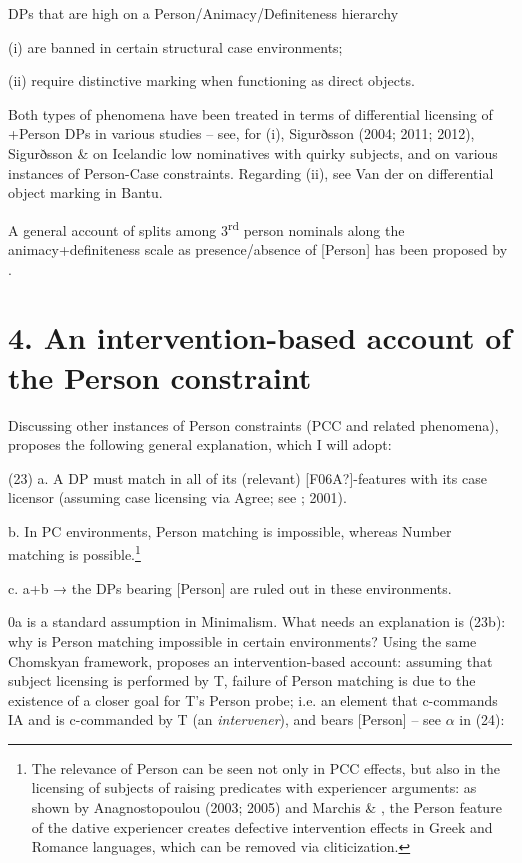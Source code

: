 \documentclass[output=paper]{langsci/langscibook}
\begin{document}
          DPs that are high on a Person/Animacy/Definiteness hierarchy

(i) are banned in certain structural case environments;

(ii) require distinctive marking when functioning as direct objects.

Both types of phenomena have been treated in terms of differential licensing of +Person DPs in various studies – see, for (i), Sigurðsson (2004; 2011; 2012), Sigurðsson \& \citet{Holmberg2008} on Icelandic low nominatives with quirky subjects, and \citet{Rezac2011} on various instances of Person-Case constraints. Regarding (ii), see Van der \citet{Wal2015} on differential object marking in Bantu.

A general account of splits among 3\textsuperscript{rd} person nominals along the animacy+definiteness scale as presence/absence of [Person] has been proposed by \citet{Richards2008}.

\section{ 4. An intervention-based account of the Person constraint}

Discussing other instances of Person constraints (PCC and related phenomena), \citet{Rezac2011} proposes the following general explanation, which I will adopt:

\label{bkm:Ref443240869}(23)  a.   A DP must match in all of its (relevant) [F06A?]-features with its case licensor (assuming case licensing via Agree; see \citealt{Chomsky2000}; 2001).

  b.   In PC environments, Person matching is impossible, whereas Number matching is possible.\footnote{The relevance of Person can be seen not only in PCC effects, but also in the licensing of subjects of raising predicates with experiencer arguments: as shown by Anagnostopoulou (2003; 2005) and Marchis \& \citet{Alexiadou2013}, the Person feature of the dative experiencer creates defective intervention effects in Greek and Romance languages, which can be removed via cliticization.}  

c.   a+b → the DPs bearing [Person] are ruled out in these environments.

0a is a standard assumption in Minimalism. What needs an explanation is (23b): why is Person matching impossible in certain environments? Using the same Chomskyan framework, \citet{Rezac2011} proposes an intervention-based account: assuming that subject licensing is performed by T, failure of Person matching is due to the existence of a closer goal for T’s Person probe; i.e. an element that c-commands IA and is c-commanded by T (an \textit{intervener}), and bears [Person] – see $\alpha $ in (24):
\end{document}
